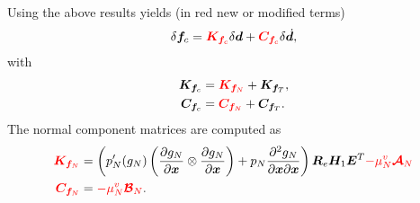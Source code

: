 \documentclass[3p]{elsarticle}
\newcommand{\vect}[1]{\boldsymbol{#1}}
\begin{document}
\noindent Using the above results yields (in red new or modified terms)
\begin{align}
	\delta\vect{f}_c =\textcolor{red}{\vect{K}_{\vect{f}_c}}\delta\vect{d}+\textcolor{red}{\vect{C}_{\vect{f}_c}}\delta\dot{\vect{d}},\label{eq:deltafc-2}
\end{align}
\noindent with
\begin{align}
	\vect{K}_{\vect{f}_c}&=\textcolor{red}{\vect{K}_{\vect{f}_N}}+\vect{K}_{\vect{f}_T},\\
	\vect{C}_{\vect{f}_c}&=\textcolor{red}{\vect{C}_{\vect{f}_N}}+\vect{C}_{\vect{f}_T}.
\end{align}
The normal component matrices are computed as
\begin{align}
	\textcolor{red}{\vect{K}_{\vect{f}_N}} &=   \left( p_N'(g_N)\left(\frac{\partial g_N}{\partial\vect{x}}\otimes\frac{\partial g_N}{\partial\vect{x}}\right)+p_N\frac{\partial^2g_N}{\partial\vect{x}\partial\vect{x}}\right)\vect{R}_e\vect{H}_1\vect{E}^T\textcolor{red}{-\mu_N^v\vect{\mathcal{A}}_N}\\
	\textcolor{red}{\vect{C}_{\vect{f}_N}} &=\textcolor{red}{-\mu_N^v\vect{\mathcal{B}}_N}.
\end{align}


%
%
\newpage
%


\end{document}
